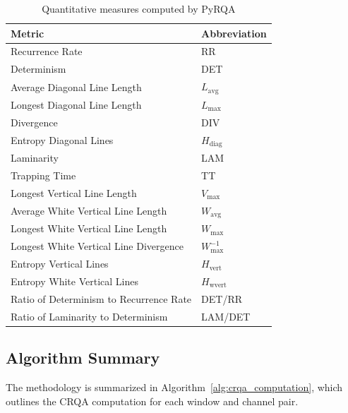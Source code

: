 \documentclass{article}
\begin{document}
				\begin{table}[h]
				\centering
				\caption{Quantitative measures computed by PyRQA}
				\label{tab:pyrqa_metrics}
				\begin{tabular}{ll}
				\toprule
				\textbf{Metric} & \textbf{Abbreviation} \\
				\midrule
				Recurrence Rate & RR \\
				Determinism & DET \\
				Average Diagonal Line Length & \(L_{\text{avg}}\) \\
				Longest Diagonal Line Length & \(L_{\text{max}}\) \\
				Divergence & DIV \\
				Entropy Diagonal Lines & \(H_{\text{diag}}\) \\
				Laminarity & LAM \\
				Trapping Time & TT \\
				Longest Vertical Line Length & \(V_{\text{max}}\) \\
				Average White Vertical Line Length & \(W_{\text{avg}}\) \\
				Longest White Vertical Line Length & \(W_{\text{max}}\) \\
				Longest White Vertical Line Divergence & \(W_{\text{max}}^{-1}\) \\
				Entropy Vertical Lines & \(H_{\text{vert}}\) \\
				Entropy White Vertical Lines & \(H_{\text{wvert}}\) \\
				Ratio of Determinism to Recurrence Rate & DET/RR \\
				Ratio of Laminarity to Determinism & LAM/DET \\
				\bottomrule
				\end{tabular}
				\end{table}


				\subsection{Algorithm Summary}
				\label{subsec:algorithm}

				The methodology is summarized in Algorithm~\ref{alg:crqa_computation}, which outlines the CRQA computation for each window and channel pair.
\end{document}
